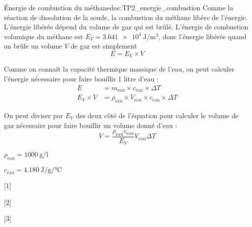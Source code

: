 \begin{doc}{Énergie de combustion du méthane}{doc:TP2_energie_combustion}
  Comme la réaction de dissolution de la soude, la combustion du méthane libère de l'énergie.
  L'énergie libérée dépend du volume de gaz qui est brûlé.
  L'énergie de combustion volumique du méthane est $E_V = \qty{3,641e4}{\joule\per\m\cubed}$, donc l'énergie libérée quand on brûle un volume $V$ de gaz est simplement 
  \begin{equation*}
    E = E_V \times V
  \end{equation*}

  Comme on connaît la capacité thermique massique de l'eau, on peut calculer l'énergie nécessaire pour faire bouillir 1 litre d'eau :
  \begin{align*}
    E &= m_\text{eau} \times c_\text{eau} \times \Delta T \\
    E_V \times V &= \rho_\text{eau} \times V_\text{eau} \times c_\text{eau} \times \Delta T
  \end{align*}

  On peut diviser par $E_V$ des deux côté de l'équation pour calculer le volume de gaz nécessaire pour faire bouillir un volume donné d'eau :
  \begin{equation*}
    V = \dfrac{\rho_\text{eau} c_\text{eau}}{E_V} V_\text{eau} \Delta T
  \end{equation*}

  \begin{donnees}
    \item $\rho_\text{eau} = \qty{1000}{\g\per\litre}$
    \item $c_\text{eau} = \qty{4,180}{\joule\per\g\per\degreeCelsius}$
  \end{donnees}
\end{doc}

[1]

[2]

[3]